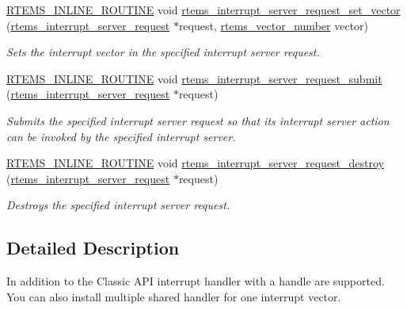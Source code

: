 \begin{DoxyCompactItemize}
\mbox{\hyperlink{group__RTEMSScoreBaseDefs_gac216239df231d5dbd15e3520b0b9313f}{R\+T\+E\+M\+S\+\_\+\+I\+N\+L\+I\+N\+E\+\_\+\+R\+O\+U\+T\+I\+NE}} void \mbox{\hyperlink{group__rtems__interrupt__extension_gabdace0e27d0d7771f58d8471284e512d}{rtems\+\_\+interrupt\+\_\+server\+\_\+request\+\_\+set\+\_\+vector}} (\mbox{\hyperlink{structrtems__interrupt__server__request}{rtems\+\_\+interrupt\+\_\+server\+\_\+request}} $\ast$request, \mbox{\hyperlink{group__ClassicINTR_ga3e434c197d99f128e78cae4d9358bd8b}{rtems\+\_\+vector\+\_\+number}} vector)
\begin{DoxyCompactList}\small\item\em Sets the interrupt vector in the specified interrupt server request. \end{DoxyCompactList}\item 
\mbox{\hyperlink{group__RTEMSScoreBaseDefs_gac216239df231d5dbd15e3520b0b9313f}{R\+T\+E\+M\+S\+\_\+\+I\+N\+L\+I\+N\+E\+\_\+\+R\+O\+U\+T\+I\+NE}} void \mbox{\hyperlink{group__rtems__interrupt__extension_ga8559c103b6e77d0fca7626ee20ee4efa}{rtems\+\_\+interrupt\+\_\+server\+\_\+request\+\_\+submit}} (\mbox{\hyperlink{structrtems__interrupt__server__request}{rtems\+\_\+interrupt\+\_\+server\+\_\+request}} $\ast$request)
\begin{DoxyCompactList}\small\item\em Submits the specified interrupt server request so that its interrupt server action can be invoked by the specified interrupt server. \end{DoxyCompactList}\item 
\mbox{\hyperlink{group__RTEMSScoreBaseDefs_gac216239df231d5dbd15e3520b0b9313f}{R\+T\+E\+M\+S\+\_\+\+I\+N\+L\+I\+N\+E\+\_\+\+R\+O\+U\+T\+I\+NE}} void \mbox{\hyperlink{group__rtems__interrupt__extension_ga214d16550a77f48cfb461afd9e7d2006}{rtems\+\_\+interrupt\+\_\+server\+\_\+request\+\_\+destroy}} (\mbox{\hyperlink{structrtems__interrupt__server__request}{rtems\+\_\+interrupt\+\_\+server\+\_\+request}} $\ast$request)
\begin{DoxyCompactList}\small\item\em Destroys the specified interrupt server request. \end{DoxyCompactList}\end{DoxyCompactItemize}


\subsection{Detailed Description}
In addition to the Classic A\+PI interrupt handler with a handle are supported. You can also install multiple shared handler for one interrupt vector. 

